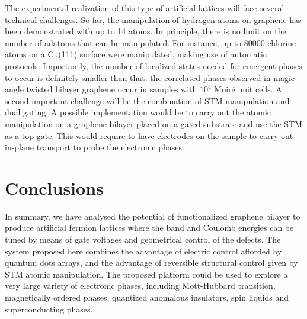 The experimental realization of this type of artificial lattices will face several technical challenges. So far, the manipulation of hydrogen atoms on graphene has been demonstrated with up to 14 atoms\cite{Brihuega2016}. In principle, there is no limit on the number of adatoms that can be manipulated\cite{khajetoorians2019}. For instance, up to %
80000 chlorine atoms on a Cu(111) surface were manipulated, making use of automatic protocols\cite{Kalff2016}.
Importantly, the number of localized states needed for emergent phases to occur
 is definitely smaller than that: the correlated phases observed in magic angle twisted bilayer graphene occur in samples with $10^4$ Moiré unit cells.
% 
A second important challenge will be the combination of STM manipulation and dual gating. A possible implementation would be to carry out the atomic manipulation on a graphene bilayer placed on a gated substrate and use the STM as a top gate. This would require to have electrodes on the sample to carry out in-plane transport to probe the electronic phases. 

\section{Conclusions}
In summary, we have analysed the potential of functionalized graphene bilayer to produce artificial fermion lattices where the band and Coulomb energies can be tuned by means of gate voltages and geometrical control of the defects. The system proposed here combines the advantage of electric control afforded by quantum dots arrays, and the advantage of reversible structural control given by STM atomic manipulation. The proposed platform could be used to explore a very large variety of electronic phases, including Mott-Hubbard transition, magnetically ordered phases, quantized anomalous insulators, spin liquids and superconducting phases.
